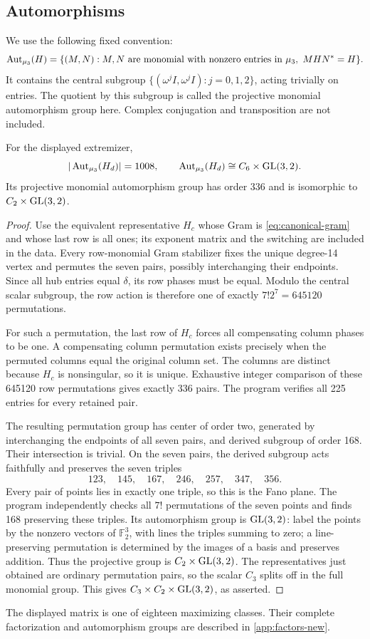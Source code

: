 \subsection{Automorphisms}
We use the following fixed convention:
\[
 \operatorname{Aut}_{\mu_3}(H)=\{(M,N):M,N\text{ are monomial with nonzero entries in }\mu_3,
                         \ MHN^*=H\}.
\]
It contains the central subgroup $\{(\omega^jI,\omega^jI):j=0,1,2\}$, acting trivially on entries. The quotient by this subgroup is called the projective monomial automorphism group here. Complex conjugation and transposition are not included.

\begin{proposition}\label{prop:automorphisms}
For the displayed extremizer,
\[
 |\operatorname{Aut}_{\mu_3}(H_d)|=1008,
 \qquad \operatorname{Aut}_{\mu_3}(H_d)\cong C_6\times\operatorname{GL}(3,2).
\]
Its projective monomial automorphism group has order 336 and is isomorphic to $C_2\times\operatorname{GL}(3,2)$.
\end{proposition}
\begin{proof}
Use the equivalent representative $H_c$ whose Gram is \eqref{eq:canonical-gram} and whose last row is all ones; its exponent matrix and the switching are included in the data. Every row-monomial Gram stabilizer fixes the unique degree-14 vertex and permutes the seven pairs, possibly interchanging their endpoints. Since all hub entries equal $\delta$, its row phases must be equal. Modulo the central scalar subgroup, the row action is therefore one of exactly $7!2^7=645120$ permutations.

For such a permutation, the last row of $H_c$ forces all compensating column phases to be one. A compensating column permutation exists precisely when the permuted columns equal the original column set. The columns are distinct because $H_c$ is nonsingular, so it is unique. Exhaustive integer comparison of these 645120 row permutations gives exactly 336 pairs. The program verifies all 225 entries for every retained pair.

The resulting permutation group has center of order two, generated by interchanging the endpoints of all seven pairs, and derived subgroup of order 168. Their intersection is trivial. On the seven pairs, the derived subgroup acts faithfully and preserves the seven triples
\[
 123,\quad145,\quad167,\quad246,\quad257,\quad347,\quad356.
\]
Every pair of points lies in exactly one triple, so this is the Fano plane. The program independently checks all $7!$ permutations of the seven points and finds 168 preserving these triples. Its automorphism group is $\operatorname{GL}(3,2)$: label the points by the nonzero vectors of $\mathbb F_2^3$, with lines the triples summing to zero; a line-preserving permutation is determined by the images of a basis and preserves addition. Thus the projective group is $C_2\times\operatorname{GL}(3,2)$. The representatives just obtained are ordinary permutation pairs, so the scalar $C_3$ splits off in the full monomial group. This gives $C_3\times C_2\times\operatorname{GL}(3,2)$, as asserted.
\end{proof}
The displayed matrix is one of eighteen maximizing classes. Their complete factorization and automorphism groups are described in \cref{app:factors-new}.
